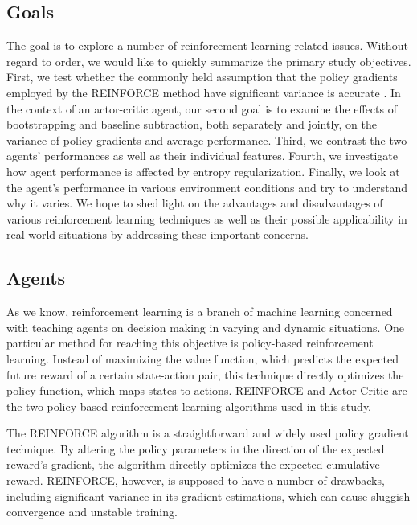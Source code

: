 \documentclass{article}
\begin{document}
\subsection{Goals}
\label{I-Goals}

The goal is to explore a number of reinforcement learning-related issues.
Without regard to order, we would like to quickly summarize the primary study objectives.
First, we test whether the commonly held assumption that the policy gradients employed by the REINFORCE method have significant variance is accurate \cite{Sutton}.
In the context of an actor-critic agent, our second goal is to examine the effects of bootstrapping and baseline subtraction, both separately and jointly, on the variance of policy gradients and average performance.
Third, we contrast the two agents' performances as well as their individual features.
Fourth, we investigate how agent performance is affected by entropy regularization.
Finally, we look at the agent's performance in various environment conditions and try to understand why it varies. 
We hope to shed light on the advantages and disadvantages of various reinforcement learning techniques as well as their possible applicability in real-world situations by addressing these important concerns.

\subsection{Agents}
\label{I-Agents}
As we know, reinforcement learning is a branch of machine learning concerned with teaching agents on decision making in varying and dynamic situations.
One particular method for reaching this objective is policy-based reinforcement learning. 
Instead of maximizing the value function, which predicts the expected future reward of a certain state-action pair, this technique directly optimizes the policy function, which maps states to actions. 
REINFORCE and Actor-Critic are the two policy-based reinforcement learning algorithms used in this study.

The REINFORCE algorithm is a straightforward and widely used policy gradient technique.
By altering the policy parameters in the direction of the expected reward's gradient, the algorithm directly optimizes the expected cumulative reward.
REINFORCE, however, is supposed to have a number of drawbacks, including significant variance in its gradient estimations, which can cause sluggish convergence and unstable training.
\end{document}
